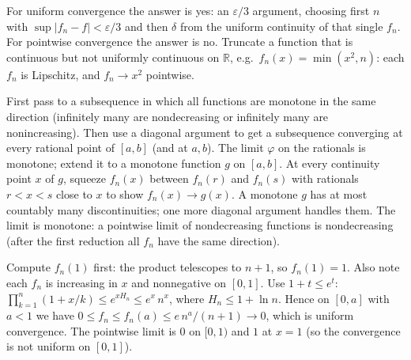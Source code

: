 \documentclass[11pt,a4paper]{article}
\begin{document}
For uniform convergence the answer is yes: an \(\varepsilon/3\) argument, choosing first \(n\) with \(\sup\lvert f_n-f\rvert\lt\varepsilon/3\) and then \(\delta\) from the uniform continuity of that single \(f_n\).
For pointwise convergence the answer is no. Truncate a function that is continuous but not uniformly continuous on \(\mathbb R\), e.g.~\(f_n(x)=\min(x^2,n)\): each \(f_n\) is Lipschitz, and \(f_n\to x^2\) pointwise.

First pass to a subsequence in which all functions are monotone in the same direction (infinitely many are nondecreasing or infinitely many are nonincreasing). Then use a diagonal argument to get a subsequence converging at every rational point of \([a,b]\) (and at \(a,b\)).
The limit \(\varphi\) on the rationals is monotone; extend it to a monotone function \(g\) on \([a,b]\). At every continuity point \(x\) of \(g\), squeeze \(f_n(x)\) between \(f_n(r)\) and \(f_n(s)\) with rationals \(r\lt x\lt s\) close to \(x\) to show \(f_n(x)\to g(x)\).
A monotone \(g\) has at most countably many discontinuities; one more diagonal argument handles them. The limit is monotone: a pointwise limit of nondecreasing functions is nondecreasing (after the first reduction all \(f_n\) have the same direction).

Compute \(f_n(1)\) first: the product telescopes to \(n+1\), so \(f_n(1)=1\). Also note each \(f_n\) is increasing in \(x\) and nonnegative on \([0,1]\).
Use \(1+t\le e^t\): \(\prod_{k=1}^n(1+x/k)\le e^{xH_n}\le e^{x}\,n^{x}\), where \(H_n\le 1+\ln n\). Hence on \([0,a]\) with \(a\lt 1\) we have \(0\le f_n\le f_n(a)\le e\, n^{a}/(n+1)\to0\), which is uniform convergence. The pointwise limit is \(0\) on \([0,1)\) and \(1\) at \(x=1\) (so the convergence is not uniform on \([0,1]\)).
\end{document}

